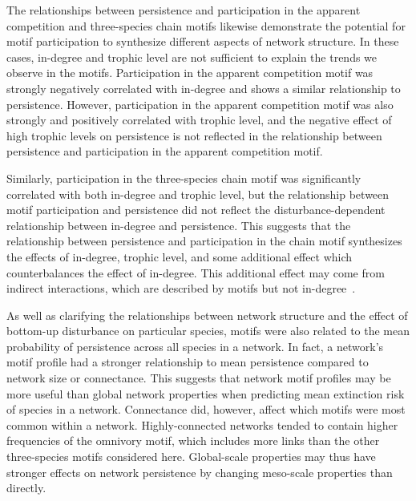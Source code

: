 \documentclass[12pt]{article}
\begin{document}
\begin{spacing}{2.0}
    
    The relationships between persistence and participation in the apparent competition and three-species chain motifs likewise demonstrate the potential for motif participation to synthesize different aspects of network structure.
    In these cases, in-degree and trophic level are not sufficient to explain the trends we observe in the motifs.
    Participation in the apparent competition motif was strongly negatively correlated with in-degree and shows a similar relationship to persistence.
    However, participation in the apparent competition motif was also strongly and positively correlated with trophic level, and the negative effect of high trophic levels on persistence is not reflected in the relationship between persistence and participation in the apparent competition motif.
    
    
    Similarly, participation in the three-species chain motif was significantly correlated with both in-degree and trophic level, but the relationship between motif participation and persistence did not reflect the disturbance-dependent relationship between in-degree and persistence.
    This suggests that the relationship between persistence and participation in the chain motif synthesizes the effects of in-degree, trophic level, and some additional effect which counterbalances the effect of in-degree.
    This additional effect may come from indirect interactions, which are described by motifs but not in-degree~\citep{Cirtwill2018FoodWebs}. 
    
    
    As well as clarifying the relationships between network structure and the effect of bottom-up disturbance on particular species, motifs were also related to the mean probability of persistence across all species in a network.
    In fact, a network's motif profile had a stronger relationship to mean persistence compared to network size or connectance. 
    This suggests that network motif profiles may be more useful than global network properties when predicting mean extinction risk of species in a network.
    Connectance did, however, affect which motifs were most common within a network. 
    Highly-connected networks tended to contain higher frequencies of the omnivory motif, which includes more links than the other three-species motifs considered here.
    Global-scale properties may thus  have stronger effects on network persistence by changing meso-scale properties than directly.
    

\end{spacing}
\end{document}
